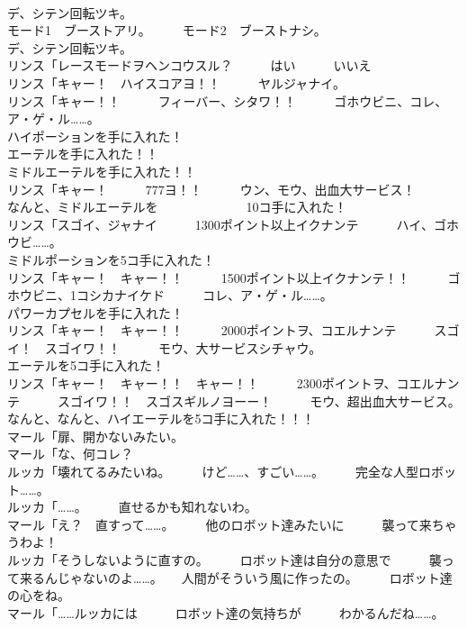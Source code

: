 \documentclass[8pt]{extreport}
\begin{document}
\begin{CJK}{UTF8}{min}
\\	デ、シテン回転ツキ。	
\\	モード1　ブーストアリ。　　　モード2　ブーストナシ。 
\\	デ、シテン回転ツキ。	
\\	リンス「レースモードヲヘンコウスル？　　　はい　　　いいえ	
\\	リンス「キャー！　ハイスコアヨ！！　　　ヤルジャナイ。	
\\	リンス「キャー！！　　　フィーバー、シタワ！！　　　ゴホウビニ、コレ、ア・ゲ・ル……。	
\\	ハイポーションを手に入れた！	
\\	エーテルを手に入れた！！	
\\	ミドルエーテルを手に入れた！！	
\\	リンス「キャー！　　　777ヨ！！　　　ウン、モウ、出血大サービス！　　　　　なんと、ミドルエーテルを　　　　　　　10コ手に入れた！	
\\	リンス「スゴイ、ジャナイ　　　1300ポイント以上イクナンテ　　　ハイ、ゴホウビ……。	
\\	ミドルポーションを5コ手に入れた！	
\\	リンス「キャー！　キャー！！　　　1500ポイント以上イクナンテ！！　　　ゴホウビニ、1コシカナイケド　　　コレ、ア・ゲ・ル……。	
\\	パワーカプセルを手に入れた！	
\\	リンス「キャー！　キャー！！　　　2000ポイントヲ、コエルナンテ　　　スゴイ！　スゴイワ！！　　　モウ、大サービスシチャウ。	
\\	エーテルを5コ手に入れた！	
\\	リンス「キャー！　キャー！！　キャー！！　　　2300ポイントヲ、コエルナンテ　　　スゴイワ！！　スゴスギルノヨーー！　　　モウ、超出血大サービス。	
\\	なんと、なんと、ハイエーテルを5コ手に入れた！！！	
\\	マール「扉、開かないみたい。	
\\	マール「な、何コレ？	
\\	ルッカ「壊れてるみたいね。　　　けど……、すごい……。　　　完全な人型ロボット……。	
\\	ルッカ「……。　　　直せるかも知れないわ。	
\\	マール「え？　直すって……。　　　他のロボット達みたいに　　　襲って来ちゃうわよ！	
\\	ルッカ「そうしないように直すの。　　　ロボット達は自分の意思で　　　襲って来るんじゃないのよ……。　　人間がそういう風に作ったの。　　　ロボット達の心をね。	
\\	マール「……ルッカには　　　ロボット達の気持ちが　　　わかるんだね……。	

\end{CJK}
\end{document}
